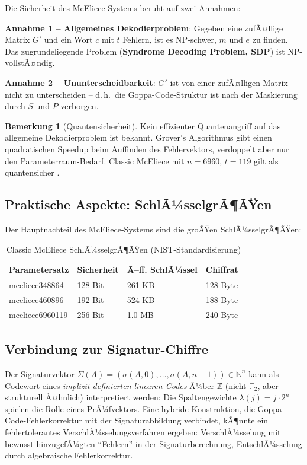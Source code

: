 ﻿\documentclass[a4paper,12pt]{scrreprt}
\theoremstyle{definition}
\newtheorem{bemerkung}{Bemerkung}[section]
\begin{document}
Die Sicherheit des McEliece-Systems beruht auf zwei Annahmen:

\textbf{Annahme 1 -- Allgemeines Dekodierproblem}: Gegeben eine zufÃ¤llige Matrix $G'$ und ein Wort $c$ mit $t$ Fehlern, ist es NP-schwer, $m$ und $e$ zu finden. Das zugrundeliegende Problem (\textbf{Syndrome Decoding Problem, SDP}) ist NP-vollstÃ¤ndig.

\textbf{Annahme 2 -- Ununterscheidbarkeit}: $G'$ ist von einer zufÃ¤lligen Matrix nicht zu unterscheiden -- d.\,h.\ die Goppa-Code-Struktur ist nach der Maskierung durch $S$ und $P$ verborgen.

\begin{bemerkung}[Quantensicherheit]
Kein effizienter Quantenangriff auf das allgemeine Dekodierproblem ist bekannt. Grover's Algorithmus \cite{Gro96} gibt einen quadratischen Speedup beim Auffinden des Fehlervektors, verdoppelt aber nur den Parameterraum-Bedarf. Classic McEliece mit $n=6960$, $t=119$ gilt als quantensicher \cite{NIST22}.
\end{bemerkung}

\subsection{Praktische Aspekte: SchlÃ¼sselgrÃ¶ÃŸen}

Der Hauptnachteil des McEliece-Systems sind die groÃŸen SchlÃ¼sselgrÃ¶ÃŸen:

\begin{table}[ht]
\centering
\caption{Classic McEliece SchlÃ¼sselgrÃ¶ÃŸen (NIST-Standardisierung)}
\begin{tabular}{@{}llll@{}}
\toprule
\textbf{Parametersatz} & \textbf{Sicherheit} & \textbf{Ã–ff. SchlÃ¼ssel} & \textbf{Chiffrat} \\
\midrule
mceliece348864  & 128 Bit & 261 KB & 128 Byte \\
mceliece460896  & 192 Bit & 524 KB & 188 Byte \\
mceliece6960119 & 256 Bit & 1.0 MB & 240 Byte \\
\bottomrule
\end{tabular}
\end{table}

\subsection{Verbindung zur Signatur-Chiffre}

Der Signaturvektor $\Sigma(A) = (\sigma(A,0),\ldots,\sigma(A,n-1)) \in \mathbb{N}^n$ kann als Codewort eines \emph{implizit definierten linearen Codes} Ã¼ber $\mathbb{Z}$ (nicht $\mathbb{F}_2$, aber strukturell Ã¤hnlich) interpretiert werden: Die Spaltengewichte $\lambda(j) = j\cdot 2^n$ spielen die Rolle eines PrÃ¼fvektors. Eine hybride Konstruktion, die Goppa-Code-Fehlerkorrektur mit der Signaturabbildung verbindet, kÃ¶nnte ein fehlertolerantes VerschlÃ¼sselungsverfahren ergeben: VerschlÃ¼sselung mit bewusst hinzugefÃ¼gten ``Fehlern'' in der Signaturberechnung, EntschlÃ¼sselung durch algebraische Fehlerkorrektur.
\end{document}
